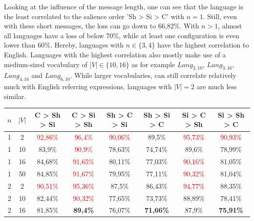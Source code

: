 Looking at the influence of the message length, one can see that the language is the least correlated to the salience order 'Sh > Si > C' with $n=1$.
Still, even with these short messages, the loss can go down to 66,82\%.
With $n>1$, almost all languages have a loss of below 70\%, while at least one configuration is even lower than 60\%.
Hereby, languages with $n \in \{3,4\}$ have the highest correlation to English.
Languages with the highest correlation also mostly make use of a medium-sized vocabulary of $|V| \in \{10,16\}$ as for example $Lang_{2,10}$, $Lang_{3,16}$, $Lang_{4,16}$ and $Lang_{6,10}$.
While larger vocabularies, can still correlate relatively much with English referring expressions, languages with $|V|=2$ are much less similar.

\begin{table}[ht]
    \centering
    \begin{tabular}{cc|c|c|c|c|c|c}
        \toprule
        $n$ & $|V|$ & \textbf{C > Sh > Si}     & \textbf{C > Si > Sh}     & \textbf{Sh > C > Si}     & \textbf{Sh > Si > C} & \textbf{Si > C > Sh}     & \textbf{Si > Sh > C}     \\\midrule
        {1} & {2}   & \textcolor{red}{92,86\%} & \textcolor{red}{96,4\%}  & \textcolor{red}{90,06\%} & {89,5\%}             & \textcolor{red}{95,73\%} & \textcolor{red}{90,93\%} \\
        {1} & {10}  & {83,9\%}                 & \textcolor{red}{90,9\%}  & {78,63\%}                & {74,74\%}            & {89,6\%}                 & {78,99\%}                \\
        {1} & {16}  & {84,68\%}                & \textcolor{red}{91,65\%} & {80,11\%}                & {77,03\%}            & \textcolor{red}{90,16\%} & {81,05\%}                \\
        {1} & {50}  & {84,85\%}                & \textcolor{red}{91,67\%} & {79,95\%}                & {77,11\%}            & \textcolor{red}{90,32\%} & {81,04\%}                \\
        {2} & {2}   & \textcolor{red}{90,51\%} & \textcolor{red}{95,36\%} & {87,5\%}                 & {86,43\%}            & \textcolor{red}{94,77\%} & {88,35\%}                \\
        {2} & {10}  & {82,44\%}                & \textcolor{red}{90,32\%} & {77,65\%}                & {73,73\%}            & {88,89\%}                & {78,41\%}                \\
        {2} & {16}  & {81,85\%}                & \textbf{89,4\%}          & {76,07\%}                & \textbf{71,66\%}     & {87,9\%}                 & \textbf{75,91\%}         \\

\end{tabular}
\end{table}

